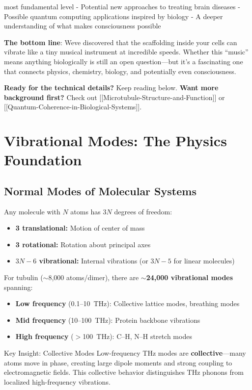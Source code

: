 most fundamental level - Potential new approaches to treating brain
diseases - Possible quantum computing applications inspired by biology -
A deeper understanding of what makes consciousness possible

\textbf{The bottom line}: We\textquotesingle ve discovered that the
scaffolding inside your cells can vibrate like a tiny musical instrument
at incredible speeds. Whether this ``music'' means anything biologically
is still an open question---but it's a fascinating
one that connects physics, chemistry, biology, and potentially even
consciousness.

\textbf{Ready for the technical details?} Keep reading below.
\textbf{Want more background first?} Check out
{[}{[}Microtubule-Structure-and-Function{]}{]} or
{[}{[}Quantum-Coherence-in-Biological-Systems{]}{]}.

\section{Vibrational Modes: The Physics Foundation}
\label{sec:vibrational-modes}

\subsection{Normal Modes of Molecular Systems}
\label{subsec:normal-modes}

Any molecule with $N$ atoms has $3N$ degrees of freedom:
\begin{itemize}
\item \textbf{3 translational:} Motion of center of mass
\item \textbf{3 rotational:} Rotation about principal axes  
\item \textbf{$3N - 6$ vibrational:} Internal vibrations (or $3N - 5$ for linear molecules)
\end{itemize}

For tubulin ($\sim$8,000 atoms/dimer), there are \textbf{$\sim$24,000 vibrational modes} spanning:
\begin{itemize}
\item \textbf{Low frequency} (0.1--10~THz): Collective lattice modes, breathing modes
\item \textbf{Mid frequency} (10--100~THz): Protein backbone vibrations
\item \textbf{High frequency} ($>$100~THz): C--H, N--H stretch modes
\end{itemize}

\begin{calloutbox}{Key Insight: Collective Modes}
Low-frequency THz modes are \textbf{collective}---many atoms move in phase, creating large dipole moments and strong coupling to electromagnetic fields. This collective behavior distinguishes THz phonons from localized high-frequency vibrations.
\end{calloutbox}

